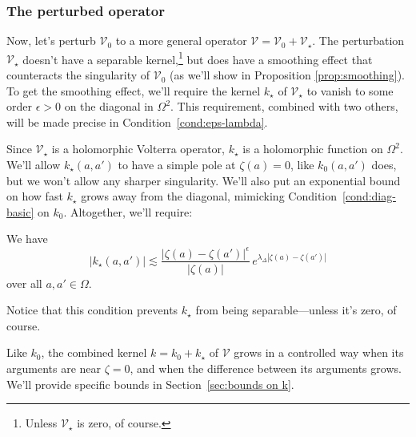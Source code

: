 \documentclass{article}
\makeatletter
\theoremstyle{plain}
\newcommand{\condconst}[2]{\item[($\text{\textsc{#1}} \mid #2$)]\protected@edef\@currentlabel{$\text{\textsc{#1}} \mid #2$}}
\newcommand{\volterra}{\mathcal{V}}
\newcommand{\hardpart}{\mathcal{V}_0}
\newcommand{\softpart}{\mathcal{V}_\star}
\newcommand{\hardker}{k_0}
\newcommand{\softker}{k_\star}
\newcommand{\domain}{\Omega}
\makeatother
\begin{document}
\subsubsection{The perturbed operator}\label{setting:perturbed}

Now, let's perturb $\hardpart$ to a more general operator $\volterra=\hardpart +\softpart$. The perturbation $\softpart$ doesn't have a separable kernel,\footnote{Unless $\softpart$ is zero, of course.} but does have a smoothing effect that counteracts the singularity of $\hardpart$ (as we'll show in Proposition \ref{prop:smoothing}). To get the smoothing effect, we'll require the kernel $\softker$ of $\softpart$ to vanish to some order $\epsilon > 0$ on the diagonal in $\Omega^2$. This requirement, combined with two others, will be made precise in Condition~\eqref{cond:eps-lambda}.

Since $\softpart$ is a holomorphic Volterra operator, $\softker$ is a holomorphic function on $\domain^2$. We'll allow $\softker(a, a')$ to have a simple pole at $\zeta(a) = 0$, like $\hardker(a, a')$ does, but we won't allow any sharper singularity. We'll also put an exponential bound on how fast $\softker$ grows away from the diagonal, mimicking Condition~\eqref{cond:diag-basic} on $\hardker$. Altogether, we'll require:
\begin{conditions}
\condconst{diag$_\star$}{\epsilon, \lambda_\Delta}\label{cond:eps-lambda} We have
\[ \big| \softker(a, a') \big| \lesssim\frac{|\zeta(a)-\zeta(a')|^\epsilon}{|\zeta(a)|}\,e^{\lambda_\Delta|\zeta(a)-\zeta(a')|}\]
over all $a, a' \in \domain$.
\end{conditions}
Notice that this condition prevents $\softker$ from being separable---unless it's zero, of course.

Like $\hardker$, the combined kernel $k = \hardker + \softker$ of $\volterra$ grows in a controlled way when its arguments are near $\zeta = 0$, and when the difference between its arguments grows. We'll provide specific bounds in Section~\ref{sec:bounds on k}. 
\end{document}
